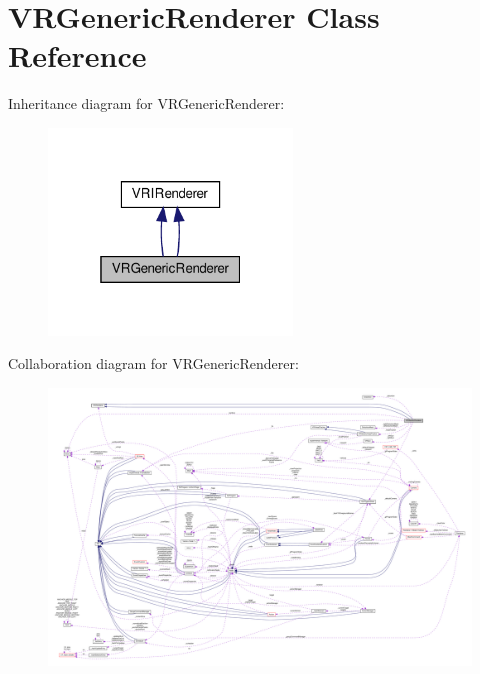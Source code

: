 \hypertarget{classVRGenericRenderer}{}\section{V\+R\+Generic\+Renderer Class Reference}
\label{classVRGenericRenderer}


Inheritance diagram for V\+R\+Generic\+Renderer\+:
\nopagebreak
\begin{figure}[H]
\begin{center}
\leavevmode
\includegraphics[width=184pt]{classVRGenericRenderer__inherit__graph}
\end{center}
\end{figure}


Collaboration diagram for V\+R\+Generic\+Renderer\+:
\nopagebreak
\begin{figure}[H]
\begin{center}
\leavevmode
\includegraphics[width=350pt]{classVRGenericRenderer__coll__graph}
\end{center}
\end{figure}

